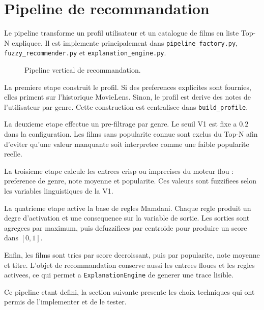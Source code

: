 \section{Pipeline de recommandation}

Le pipeline transforme un profil utilisateur et un catalogue de films en liste Top-N expliquee. Il est implemente principalement dans \texttt{pipeline\_factory.py}, \texttt{fuzzy\_recommender.py} et \texttt{explanation\_engine.py}.

\begin{figure}[H]
\centering
{}
\caption{Pipeline vertical de recommandation.}
\label{fig:pipeline}
\end{figure}

La premiere etape construit le profil. Si des preferences explicites sont fournies, elles priment sur l'historique MovieLens. Sinon, le profil est derive des notes de l'utilisateur par genre. Cette construction est centralisee dans \texttt{build\_profile}.

La deuxieme etape effectue un pre-filtrage par genre. Le seuil V1 est fixe a $0.2$ dans la configuration. Les films sans popularite connue sont exclus du Top-N afin d'eviter qu'une valeur manquante soit interpretee comme une faible popularite reelle.

La troisieme etape calcule les entrees crisp ou imprecises du moteur flou : preference de genre, note moyenne et popularite. Ces valeurs sont fuzzifiees selon les variables linguistiques de la V1.

La quatrieme etape active la base de regles Mamdani. Chaque regle produit un degre d'activation et une consequence sur la variable de sortie. Les sorties sont agregees par maximum, puis defuzzifiees par centroide pour produire un score dans $[0,1]$.

Enfin, les films sont tries par score decroissant, puis par popularite, note moyenne et titre. L'objet de recommandation conserve aussi les entrees floues et les regles activees, ce qui permet a \texttt{ExplanationEngine} de generer une trace lisible.

Ce pipeline etant defini, la section suivante presente les choix techniques qui ont permis de l'implementer et de le tester.
